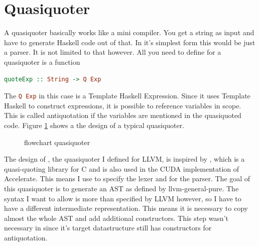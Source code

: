 \documentclass[a4paper,bibliography=totocnumbered,parskip,headsepline]{scrbook}
\begin{document}
\section{Quasiquoter}
A quasiquoter basically works like a mini compiler.
You get a string as input and have to generate Haskell code out of that.
In it's simplest form this would be just a parser.
It is not limited to that however.
All you need to define for a quasiquoter is a function
\begin{lstlisting}[language=haskell]
quoteExp :: String -> Q Exp
\end{lstlisting}
The \lstinline[language=haskell]!Q Exp! in this case is a Template Haskell Expression.
Since it uses Template Haskell to construct expressions, it is possible to reference variables in scope.
This is called antiquotation if the variables are mentioned in the quasiquoted code.
Figure \ref{fig:quasichart} shows a the design of a typical quasiquoter.

\begin{figure}
\begin{center}
\end{center}
\caption{flowchart quasiquoter}
\label{fig:quasichart}
\end{figure}

The design of , the quasiquoter I defined for LLVM, is inspired by , which is a quasi-quoting library for C and is also used in the CUDA implementation of Accelerate.
This means I use  to specify the lexer and  for the parser.
The goal of this quasiquoter is to generate an AST as defined by llvm-general-pure.
The syntax I want to allow is more than specified by LLVM however, so I have to have a different intermediate representation.
This means it is necessary to copy almost the whole AST and add additional constructors.
This step wasn't necessary in  since it's target datastructure still has constructors for antiquotation.
\end{document}
